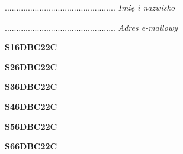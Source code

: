 \begin{turn}{90}\begin{minipage}{\linewidth} \vspace{20mm} ................................................  \textit{Imię i nazwisko}\end{minipage}\end{turn}

\begin{turn}{90}\begin{minipage}{\linewidth} \vspace{20mm} ................................................  \textit{Adres e-mailowy}\end{minipage}\end{turn}

\begin{turn}{90}\huge \begin{minipage}{\linewidth} \vspace{10mm}\textbf{S16DBC22C}\end{minipage}\end{turn}

\begin{turn}{90}\huge \begin{minipage}{\linewidth} \vspace{10mm}\textbf{S26DBC22C}\end{minipage}\end{turn}

\begin{turn}{90}\huge \begin{minipage}{\linewidth} \vspace{10mm}\textbf{S36DBC22C}\end{minipage}\end{turn}

\begin{turn}{90}\huge \begin{minipage}{\linewidth} \vspace{10mm}\textbf{S46DBC22C}\end{minipage}\end{turn}

\begin{turn}{90}\huge \begin{minipage}{\linewidth} \vspace{10mm}\textbf{S56DBC22C}\end{minipage}\end{turn}

\begin{turn}{90}\huge \begin{minipage}{\linewidth} \vspace{10mm}\textbf{S66DBC22C}\end{minipage}\end{turn}

